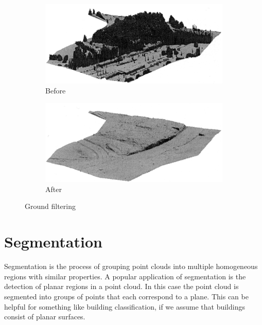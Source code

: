 \begin{figure}[htb]
  \centering
  \begin{subfigure}[b]{0.9\linewidth}
    \centering
    \includegraphics[width=\textwidth]{figs/axelsson-before.png}
    \caption{Before}
  \end{subfigure}

  \begin{subfigure}[b]{0.9\linewidth}
    \centering
    \includegraphics[width=\textwidth]{figs/axelsson-after.png}
    \caption{After}
  \end{subfigure}
\caption{Ground filtering \citep{axelsson2000generation}}
\label{fig:axelsson}
\end{figure}

\section{Segmentation}
\label{sec:segmentation}
Segmentation is the process of grouping point clouds into multiple homogeneous regions with similar properties.
A popular application of segmentation is the detection of planar regions in a point cloud.
In this case the point cloud is segmented into groups of points that each correspond to a plane.
This can be helpful for something like building classification, if we assume that buildings consist of planar surfaces.

